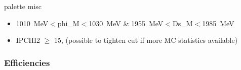 \documentclass{beamer}
\begin{document}
\begin{frame}[fragile]
\begin{beamercolorbox}[rounded=true,shadow=true]{palette misc}
\begin{itemize}
\begin{columns}
\begin{column}{.48\textwidth}
\end{column}
\end{columns}

\item \SI{1010}{MeV}$<$phi\_M$<$\SI{1030}{MeV} \& \SI{1955}{MeV}$<$Ds\_M$<$\SI{1985}{MeV}
\item IPCHI2 $\geq$ 15,\small{ (possible to tighten cut if more MC statistics available)}
\end{itemize}
\end{beamercolorbox}




\end{frame}
\LogoOn


\LogoOff
\begin{frame}
\frametitle{Efficiencies}
\begin{scriptsize}


\end{scriptsize}
\end{frame}
\end{document}
